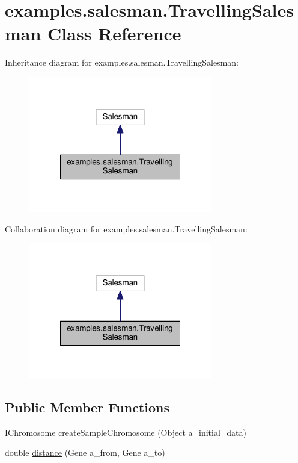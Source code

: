 \hypertarget{classexamples_1_1salesman_1_1_travelling_salesman}{\section{examples.\-salesman.\-Travelling\-Salesman Class Reference}
\label{classexamples_1_1salesman_1_1_travelling_salesman}
}


Inheritance diagram for examples.\-salesman.\-Travelling\-Salesman\-:
\nopagebreak
\begin{figure}[H]
\begin{center}
\leavevmode
\includegraphics[width=228pt]{classexamples_1_1salesman_1_1_travelling_salesman__inherit__graph}
\end{center}
\end{figure}


Collaboration diagram for examples.\-salesman.\-Travelling\-Salesman\-:
\nopagebreak
\begin{figure}[H]
\begin{center}
\leavevmode
\includegraphics[width=228pt]{classexamples_1_1salesman_1_1_travelling_salesman__coll__graph}
\end{center}
\end{figure}
\subsection*{Public Member Functions}
\begin{DoxyCompactItemize}
\item 
I\-Chromosome \hyperlink{classexamples_1_1salesman_1_1_travelling_salesman_ae7c685f5c77b358a9abd2e52244dfd85}{create\-Sample\-Chromosome} (Object a\-\_\-initial\-\_\-data)
\item 
double \hyperlink{classexamples_1_1salesman_1_1_travelling_salesman_a936df47bd7b28bba8a1e1718714e0ace}{distance} (Gene a\-\_\-from, Gene a\-\_\-to)
\end{DoxyCompactItemize}
